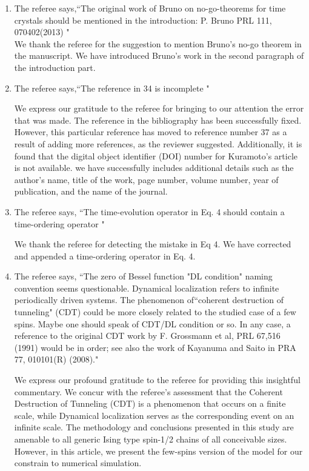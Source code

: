 \documentclass[aps,prb,reprint,showpacs,floatfix,superscriptaddress, onecolumn, 9pt]{revtex4-2}
\newcommand{\ar}[1]{{\color{blue}#1}} %
\begin{document}
\begin{enumerate}
    \item The referee says,``The original work of Bruno on no-go-theorems for time crystals should be mentioned in the introduction: P. Bruno PRL 111, 070402(2013) "\\

    \ar{
    We thank the referee for the suggestion to mention Bruno's no-go theorem in the manuscript. We have introduced Bruno's work in the second paragraph of the introduction part.
    }
    \item The referee says,``The reference in 34 is incomplete "

    \ar{    	
    We express our gratitude to the referee for bringing to our attention the error that was made. The reference in the bibliography has been successfully fixed. However, this particular reference has moved to reference number 37 as a result of adding more references, as the reviewer suggested. Additionally, it is found that the digital object identifier (DOI) number for Kuramoto's article is not available. we have successfully includes additional details such as the author's name, title of the work, page number, volume number, year of publication, and the name of the journal.
    }

    \item The referee says, ``The time-evolution operator in Eq. 4 should contain a time-ordering operator "

    \ar{
    We thank the referee for detecting the mistake in Eq 4. We have corrected and appended a time-ordering operator in Eq. 4.
    }

    \item The referee says, ``The zero of Bessel function "DL condition" naming convention seems questionable. Dynamical localization refers to infinite periodically driven systems. The phenomenon of``coherent destruction of tunneling" (CDT) could be more closely related to the studied case of a few spins. Maybe one should speak of CDT/DL condition or so. In any case, a reference to the original CDT work by F. Grossmann et al, PRL 67,516 (1991) would be in order; see also the work of Kayanuma and Saito in PRA 77, 010101(R) (2008)."\\

    \ar{
    We express our profound gratitude to the referee for providing this insightful commentary. We concur with the referee's assessment that the Coherent Destruction of Tunneling (CDT) is a phenomenon that occurs on a finite scale, while Dynamical localization serves as the corresponding event on an infinite scale. The methodology and conclusions presented in this study are amenable to all generic Ising type spin-1/2 chains of all conceivable sizes. However, in this article, we present the few-spins version of the model for our constrain to numerical simulation.
    
}
\end{enumerate}
\end{document}
